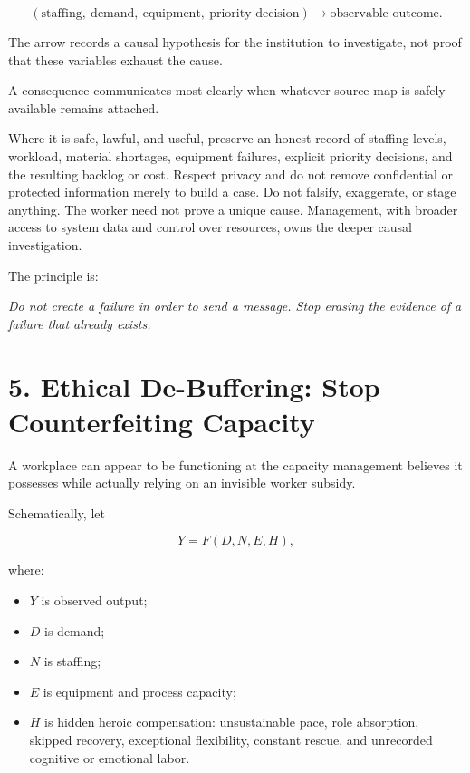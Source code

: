 \documentclass[11pt,oneside]{article}
\providecommand{\tightlist}{%
  \setlength{\itemsep}{0.22em}\setlength{\parskip}{0pt}}
\renewenvironment{quote}
  {\begin{tcolorbox}[
      enhanced,
      breakable,
      colback=ManifestLight,
      colframe=ManifestRule,
      boxrule=0pt,
      leftrule=3pt,
      arc=0pt,
      outer arc=0pt,
      left=10pt,right=10pt,top=8pt,bottom=8pt,
      before skip=0.8em,after skip=0.8em
    ]\itshape}
  {\end{tcolorbox}}
\begin{document}
\[
(\text{staffing},\ \text{demand},\ \text{equipment},\ \text{priority decision})
\longrightarrow
\text{observable outcome}.
\]

The arrow records a causal hypothesis for the institution to
investigate, not proof that these variables exhaust the cause.

A consequence communicates most clearly when whatever source-map is
safely available remains attached.

Where it is safe, lawful, and useful, preserve an honest record of
staffing levels, workload, material shortages, equipment failures,
explicit priority decisions, and the resulting backlog or cost. Respect
privacy and do not remove confidential or protected information merely
to build a case. Do not falsify, exaggerate, or stage anything. The
worker need not prove a unique cause. Management, with broader access to
system data and control over resources, owns the deeper causal
investigation.

The principle is:

\begin{quote}
Do not create a failure in order to send a message. Stop erasing the
evidence of a failure that already exists.
\end{quote}

\hypertarget{ethical-de-buffering-stop-counterfeiting-capacity}{%
\section{5. Ethical De-Buffering: Stop Counterfeiting
Capacity}\label{ethical-de-buffering-stop-counterfeiting-capacity}}

A workplace can appear to be functioning at the capacity management
believes it possesses while actually relying on an invisible worker
subsidy.

Schematically, let

\[
Y = F(D,N,E,H),
\]

where:

\begin{itemize}
\tightlist
\item
  \(Y\) is observed output;
\item
  \(D\) is demand;
\item
  \(N\) is staffing;
\item
  \(E\) is equipment and process capacity;
\item
  \(H\) is hidden heroic compensation: unsustainable pace, role
  absorption, skipped recovery, exceptional flexibility, constant
  rescue, and unrecorded cognitive or emotional labor.
\end{itemize}
\end{document}
